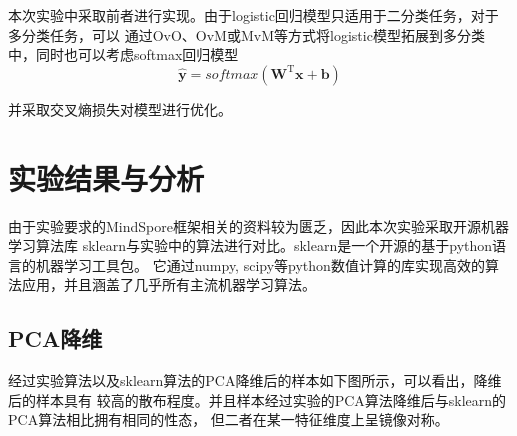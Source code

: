 \documentclass[notitlepage]{article}
\begin{document}
本次实验中采取前者进行实现。由于logistic回归模型只适用于二分类任务，对于多分类任务，可以
通过OvO、OvM或MvM等方式将logistic模型拓展到多分类中，同时也可以考虑softmax回归模型
\begin{equation*}
    \hat{\boldsymbol{y}} = softmax(\mathbf{W}^{\mathrm{T}} \boldsymbol{x} + \boldsymbol{b})
\end{equation*}

并采取交叉熵损失对模型进行优化。

\section{实验结果与分析}

由于实验要求的MindSpore框架相关的资料较为匮乏，因此本次实验采取开源机器学习算法库
sklearn与实验中的算法进行对比。sklearn是一个开源的基于python语言的机器学习工具包。
它通过numpy, scipy等python数值计算的库实现高效的算法应用，并且涵盖了几乎所有主流机器学习算法。

\subsection*{PCA降维}

经过实验算法以及sklearn算法的PCA降维后的样本如下图所示，可以看出，降维后的样本具有
较高的散布程度。并且样本经过实验的PCA算法降维后与sklearn的PCA算法相比拥有相同的性态，
但二者在某一特征维度上呈镜像对称。
\end{document}
